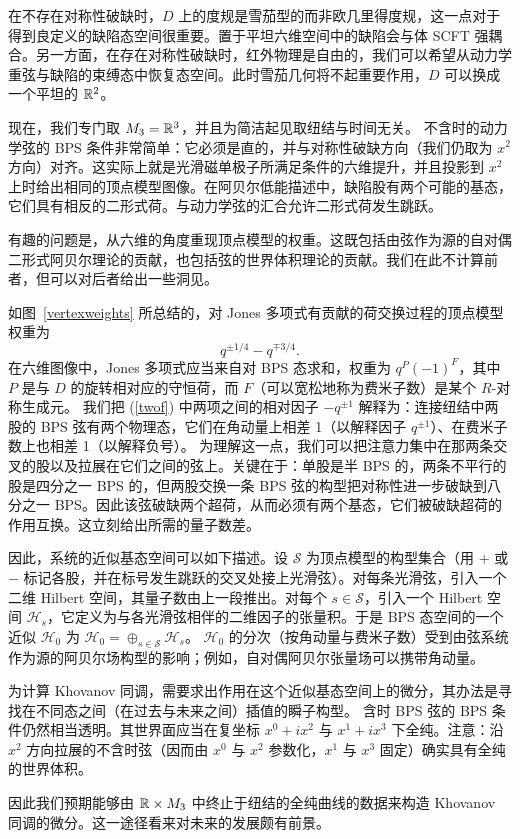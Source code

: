 在不存在对称性破缺时，$D$ 上的度规是雪茄型的而非欧几里得度规，这一点对于得到良定义的缺陷态空间很重要。置于平坦六维空间中的缺陷会与体 SCFT 强耦合。另一方面，在存在对称性破缺时，红外物理是自由的，我们可以希望从动力学重弦与缺陷的束缚态中恢复态空间。此时雪茄几何将不起重要作用，$D$ 可以换成一个平坦的 ${\mathbb R}^2$。

现在，我们专门取 $M_3 = {\mathbb R}^3$，并且为简洁起见取纽结与时间无关。
不含时的动力学弦的 BPS 条件非常简单：它必须是直的，并与对称性破缺方向（我们仍取为 $x^2$ 方向）对齐。这实际上就是光滑磁单极子所满足条件的六维提升，并且投影到 $x^2$ 上时给出相同的顶点模型图像。在阿贝尔低能描述中，缺陷股有两个可能的基态，它们具有相反的二形式荷。与动力学弦的汇合允许二形式荷发生跳跃。

有趣的问题是，从六维的角度重现顶点模型的权重。这既包括由弦作为源的自对偶二形式阿贝尔理论的贡献，也包括弦的世界体积理论的贡献。我们在此不计算前者，但可以对后者给出一些洞见。

如图~\ref{vertexweights} 所总结的，对 Jones 多项式有贡献的荷交换过程的顶点模型权重为
\begin{equation}
\label{twof}q^{\pm 1/4}-q^{\mp 3/4}. \end{equation}
  在六维图像中，Jones 多项式应当来自对 BPS 态求和，权重为 $q^P(-1)^F$，其中 $P$ 是与 $D$ 的旋转相对应的守恒荷，而 $F$（可以宽松地称为费米子数）是某个 $R$-对称生成元。
我们把 (\ref{twof}) 中两项之间的相对因子 $-q^{\pm 1}$ 解释为：连接纽结中两股的 BPS 弦有两个物理态，它们在角动量上相差 1（以解释因子 $q^{\pm 1}$）、在费米子数上也相差 1（以解释负号）。
为理解这一点，我们可以把注意力集中在那两条交叉的股以及拉展在它们之间的弦上。关键在于：单股是半 BPS 的，两条不平行的股是四分之一 BPS 的，但两股交换一条 BPS 弦的构型把对称性进一步破缺到八分之一 BPS。因此该弦破缺两个超荷，从而必须有两个基态，它们被破缺超荷的作用互换。这立刻给出所需的量子数差。


因此，系统的近似基态空间可以如下描述。设 $\mathcal S$ 为顶点模型的构型集合（用 $+$ 或 $-$ 标记各股，并在标号发生跳跃的交叉处接上光滑弦）。对每条光滑弦，引入一个二维 Hilbert 空间，其量子数由上一段推出。对每个 $s\in \mathcal S$，引入一个 Hilbert 空间 $\mathcal H_s$，它定义为与各光滑弦相伴的二维因子的张量积。于是 BPS 态空间的一个近似 $\mathcal H_0$ 为 $\mathcal H_0=\oplus_{s\in\mathcal S}\mathcal H_s$。
$\mathcal H_0$ 的分次（按角动量与费米子数）受到由弦系统作为源的阿贝尔场构型的影响；例如，自对偶阿贝尔张量场可以携带角动量。

为计算 Khovanov 同调，需要求出作用在这个近似基态空间上的微分，其办法是寻找在不同态之间（在过去与未来之间）插值的瞬子构型。
含时 BPS 弦的 BPS 条件仍然相当透明。其世界面应当在复坐标 $x^0 + i x^2$ 与 $x^1 + i x^3$ 下全纯。注意：沿 $x^2$ 方向拉展的不含时弦（因而由 $x^0$ 与 $x^2$ 参数化，$x^1$ 与 $x^3$ 固定）确实具有全纯的世界体积。

因此我们预期能够由 ${\mathbb R} \times M_3$ 中终止于纽结的全纯曲线的数据来构造 Khovanov 同调的微分。这一途径看来对未来的发展颇有前景。
